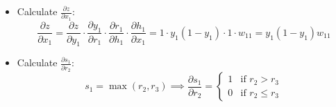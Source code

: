 \documentclass{article}
\begin{document}
\begin{enumerate}[label=\alph*)]
\begin{itemize}
      \item Calculate \(\frac{\partial z}{\partial x_1}\):
      \[
      \frac{\partial z}{\partial x_1} = \frac{\partial z}{\partial y_1} \cdot \frac{\partial y_1}{\partial r_1} \cdot \frac{\partial r_1}{\partial h_1} \cdot \frac{\partial h_1}{\partial x_1} = 1 \cdot y_1 (1 - y_1) \cdot 1 \cdot w_{11} = y_1 (1 - y_1) w_{11}
      \]

      \item Calculate \(\frac{\partial s_1}{\partial r_2}\):
      \[
      s_1 = \max(r_2, r_3) \implies \frac{\partial s_1}{\partial r_2} = 
      \begin{cases} 
         1 & \text{if } r_2 > r_3 \\
         0 & \text{if } r_2 \leq r_3 
      \end{cases}
      \]
   \end{itemize}

\end{enumerate}

\clearpage
\end{document}
